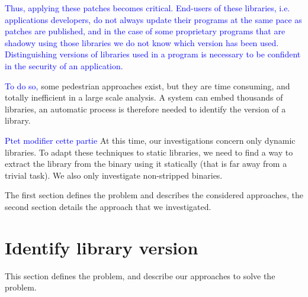 \documentclass{article}
\newcommand{\ludo}[1]{\textcolor{blue}{#1}}
\newcommand{\thom}[1]{\textcolor{red}{#1}}
\begin{document}
    \ludo{Thus, applying these patches becomes critical.}
    \ludo{End-users of these libraries, i.e. applications developers, do not
    always update their programs at the same pace as patches are published,
    and in the case of some proprietary programs that are shadowy using those
    libraries we do not know which version has been used.}
    \ludo{Distinguishing versions of libraries used in a program is necessary
    to be confident in the security of an application.} 
    
    
    
    \ludo{To do so, }some pedestrian approaches exist,
    but they are time consuming, and totally inefficient in a large scale
    analysis. A system can embed thousands of libraries, an automatic process
    is therefore needed to identify the version of a library.
    
    \ludo{Ptet modifier cette partie}
    At this time, our investigations concern only dynamic libraries. To adapt
    these techniques to static libraries, we need to find a way to extract the
    library from the binary using it statically (that is far away from a
    trivial task). We also only investigate non-stripped binaries.
    
    The first section defines the problem and describes the considered
    approaches, the second section details the approach that we investigated.
    

   \section{Identify library version}
	This section defines the problem, and describe our approaches to solve the problem.
\end{document}
